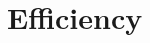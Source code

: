 \documentclass[t,10pt]{beamer}
\newcommand{\fSlide}[2]{
\begin{frame}[plain]{}%
  \vspace{4cm}%
  \Large #1\\[0.2cm]%
  {\LARGE\textbf{#2}}%
	\addtocounter{framenumber}{-1}%
\end{frame}%
}
\begin{document}

%



\section{Efficiency}

%
%
%
\end{document}
